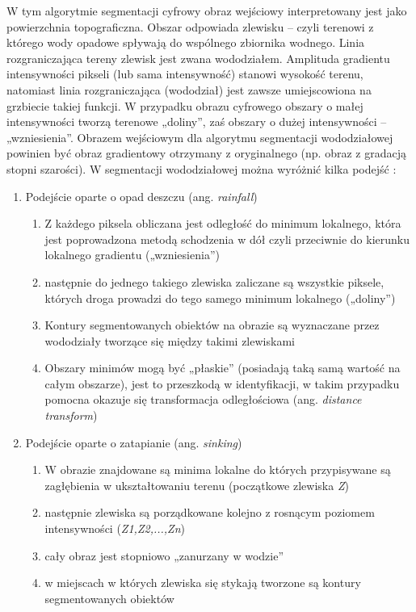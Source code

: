 \documentclass[conference]{IEEEtran}
\begin{document}
W tym algorytmie segmentacji cyfrowy obraz wejściowy interpretowany jest jako powierzchnia
topograficzna. Obszar odpowiada zlewisku – czyli terenowi z którego wody opadowe spływają do
wspólnego zbiornika wodnego. Linia rozgraniczająca tereny zlewisk jest zwana wododziałem.
Amplituda gradientu intensywności pikseli (lub sama intensywność) stanowi wysokość terenu,
natomiast linia rozgraniczająca (wododział) jest zawsze umiejscowiona na grzbiecie takiej funkcji. W
przypadku obrazu cyfrowego obszary o małej intensywności tworzą terenowe „doliny”, zaś obszary o
dużej intensywności – „wzniesienia”. 
\cite{b3}
Obrazem wejściowym dla algorytmu segmentacji wododziałowej powinien być obraz gradientowy
otrzymany z oryginalnego (np. obraz z gradacją stopni szarości).
W segmentacji wododziałowej można wyróżnić kilka podejść 
\cite{b8}:
\begin{enumerate}
\item Podejście oparte o opad deszczu (ang. \textit{rainfall})
\begin{enumerate}
\item Z każdego piksela obliczana jest odległość do minimum lokalnego, która jest poprowadzona
metodą schodzenia w dół czyli przeciwnie do kierunku lokalnego gradientu („wzniesienia”)
\item następnie do jednego takiego zlewiska zaliczane są wszystkie piksele, których droga prowadzi
do tego samego minimum lokalnego („doliny”)
\item Kontury segmentowanych obiektów na obrazie są wyznaczane przez wododziały tworzące się
między takimi zlewiskami
\item Obszary minimów mogą być „płaskie” (posiadają taką samą wartość na całym obszarze), jest
to przeszkodą w identyfikacji, w takim przypadku pomocna okazuje się transformacja odległościowa
(ang. \textit{distance transform})
\end{enumerate}
\item Podejście oparte o zatapianie (ang. \textit{sinking})
\begin{enumerate}
\item W obrazie znajdowane są minima lokalne do których przypisywane są zagłębienia w
ukształtowaniu terenu (początkowe zlewiska \textit{Z})
\item następnie zlewiska są porządkowane kolejno z rosnącym poziomem intensywności
(\textit{Z1,Z2,...,Zn})
\item cały obraz jest stopniowo „zanurzany w wodzie”
\item w miejscach w których zlewiska się stykają tworzone są kontury segmentowanych obiektów
\end{enumerate}
\end{enumerate}
\end{document}
